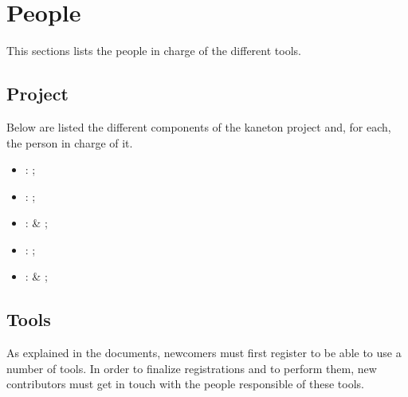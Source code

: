 %
%
%
%
%
%

%
%

\chapter{People}
\label{chapter:people}

This sections lists the people in charge of the different tools.

\newpage

%
%

%
%

\section{Project}

Below are listed the different components of the kaneton project and, for each,
the person in charge of it.

\begin{itemize}
  \item
    : ;
  \item
    : ;
  \item
    :  \& ;
  \item
    : ;
  \item
    :  \& ;
\end{itemize}

%
%

\section{Tools}

As explained in the documents, newcomers must first register to be able to
use a number of tools. In order to finalize registrations and to perform them,
new contributors must get in touch with the people responsible of these
tools.

